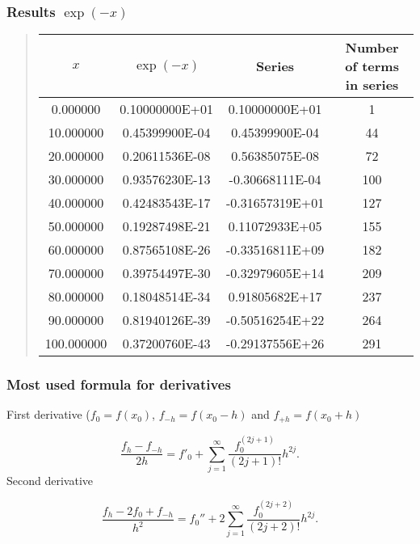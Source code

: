 \documentclass{beamer}
\newenvironment{block_mdfboxadmon}[1][]{\begin{block}{#1}}{\end{block}}
\begin{document}
\begin{frame}
\frametitle{Results $\exp{(-x)}$}

\begin{block_mdfboxadmon}


\begin{quote}
\begin{tabular}{cccc}
\hline
\multicolumn{1}{c}{ $x$ } & \multicolumn{1}{c}{ $\exp{(-x)}$ } & \multicolumn{1}{c}{ Series } & \multicolumn{1}{c}{ Number of terms in series } \\
\hline
0.000000                  & 0.10000000E+01            & 0.10000000E+01            & 1                         \\
10.000000                 & 0.45399900E-04            & 0.45399900E-04            & 44                        \\
20.000000                 & 0.20611536E-08            & 0.56385075E-08            & 72                        \\
30.000000                 & 0.93576230E-13            & -0.30668111E-04           & 100                       \\
40.000000                 & 0.42483543E-17            & -0.31657319E+01           & 127                       \\
50.000000                 & 0.19287498E-21            & 0.11072933E+05            & 155                       \\
60.000000                 & 0.87565108E-26            & -0.33516811E+09           & 182                       \\
70.000000                 & 0.39754497E-30            & -0.32979605E+14           & 209                       \\
80.000000                 & 0.18048514E-34            & 0.91805682E+17            & 237                       \\
90.000000                 & 0.81940126E-39            & -0.50516254E+22           & 264                       \\
100.000000                & 0.37200760E-43            & -0.29137556E+26           & 291                       \\
\hline
\end{tabular}
\end{quote}

\noindent
\end{block_mdfboxadmon}
\end{frame}

\begin{frame}
\frametitle{Most used formula for derivatives}

\begin{block_mdfboxadmon}
First derivative  ($f_0 = f(x_0)$, $f_{-h}=f(x_0-h)$ and $f_{+h}=f(x_0+h)$

\[
   \frac{f_h-f_{-h}}{2h}=f'_0+\sum_{j=1}^{\infty}\frac{f_0^{(2j+1)}}{(2j+1)!}h^{2j}.
\]
Second derivative

\[
 \frac{ f_h -2f_0 +f_{-h}}{h^2}=f_0''+2\sum_{j=1}^{\infty}\frac{f_0^{(2j+2)}}{(2j+2)!}h^{2j}.
\]
\end{block_mdfboxadmon}
\end{frame}
\end{document}
